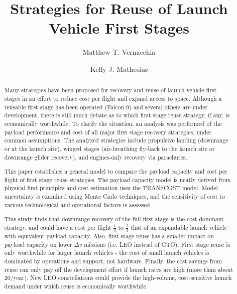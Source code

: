 \documentclass[conf]{new-aiaa}
\title{Strategies for Reuse of Launch Vehicle First Stages}
\author[1, 2, 3]{Matthew T. Vernacchia}
\author[1, 2]{Kelly J. Mathesius}
\affil[1]{Department of Aeronautics and Astronautics, Massachusetts Institute of Technology, 77 Massachusetts Avenue, Cambridge, MA 02139}
\affil[2]{Both authors contributed equally to this work.}
\affil[3]{Corresponding author: \textup{\href{mvernacc@mit.edu}{mvernacc@mit.edu}}}
\begin{document}
\maketitle
\saythanks

\begin{abstract}
Many strategies have been proposed for recovery and reuse of launch vehicle first stages in an effort to reduce cost per flight and expand access to space. Although a reusable first stage has been operated (Falcon 9) and several others are under development, there is still much debate as to which first stage reuse strategy, if any, is economically worthwhile. To clarify the situation, an analysis was performed of the payload performance and cost of all major first stage recovery strategies, under common assumptions. The analyzed strategies include propulsive landing (downrange or at the launch site), winged stages (air-breathing fly-back to the launch site or downrange glider recovery), and engines-only recovery via parachutes.

This paper establishes a general model to compare the payload capacity and cost per flight of first stage reuse strategies. The payload capacity model is neatly derived from physical first principles and cost estimation uses the TRANSCOST model. Model uncertainty is examined using Monte Carlo techniques, and the sensitivity of cost to various technological and operational factors is assessed.

This study finds that downrange recovery of the full first stage is the cost-dominant strategy, and could have a cost per flight $\frac{1}{3}$ to $\frac{2}{3}$ that of an expandable launch vehicle with equivalent payload capacity. Also, first stage reuse has a smaller impact on payload capacity on lower $\Delta v$ missions (i.e. LEO instead of GTO).  First stage reuse is only worthwhile for larger launch vehicles - the cost of small launch vehicles is dominated by operations and support, not hardware. Finally, the cost savings from reuse can only pay off the development effort if launch rates are high (more than about 20/year). New LEO constellations could provide the high-volume, cost-sensitive launch demand under which reuse is economically worthwhile.
\end{abstract}
\end{document}
